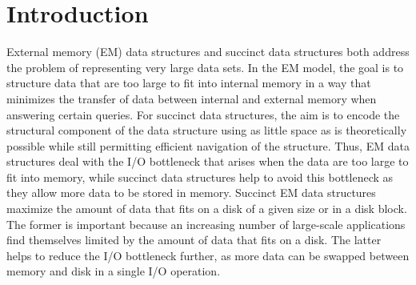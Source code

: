 %
%
%
%
%
%

\section{Introduction}

External memory (EM) data structures and succinct data structures both
address the problem of representing very large data sets.
In the EM model, the goal is to structure data that are too large to fit into
internal memory in a way that minimizes the transfer of data between
internal and external memory when answering certain queries.
For succinct data structures, the aim is to encode the structural
component of the data structure using as little space as is
theoretically possible while still permitting efficient navigation of
the structure.
Thus, EM data structures deal with the I/O bottleneck
that arises when the data are too large to fit into memory, while
succinct data structures help to avoid this bottleneck as they allow
more data to be stored in memory.
Succinct EM data structures maximize the amount of data that fits on a disk of
a given size or in a disk block.
The former is important because an increasing number of
large-scale applications find themselves limited by the amount of data
that fits on a disk.
The latter helps to reduce the I/O bottleneck further, as more data
can be swapped between memory and disk in a single I/O operation.

